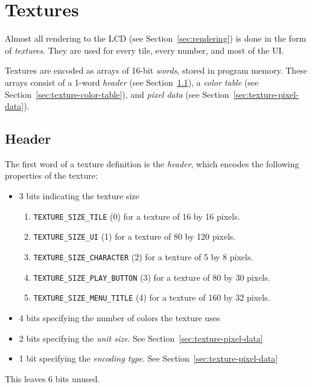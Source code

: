 \section{Textures}
\label{sec:textures}

Almost all rendering to the LCD (see Section~\ref{sec:rendering}) is done in
the form of \emph{textures}. They are used for every tile, every number, and
most of the UI\@.

Textures are encoded as arrays of 16-bit \emph{words}, stored in program
memory. These arrays consist of a 1-word \emph{header} (see
Section~\ref{sec:texture-header}), a \emph{color table} (see
Section~\ref{sec:texture-color-table}), and \emph{pixel data} (see
Section~\ref{sec:texture-pixel-data}).

\subsection{Header}
\label{sec:texture-header}

The first word of a texture definition is the \emph{header}, which encodes the
following properties of the texture:

\begin{itemize}
\item 3 bits indicating the texture size

  \begin{enumerate}
  \item \texttt{TEXTURE\_SIZE\_TILE} (0) for a texture of 16 by 16 pixels.
  \item \texttt{TEXTURE\_SIZE\_UI} (1) for a texture of 80 by 120 pixels.
  \item \texttt{TEXTURE\_SIZE\_CHARACTER} (2) for a texture of 5 by 8 pixels.
  \item \texttt{TEXTURE\_SIZE\_PLAY\_BUTTON} (3) for a texture of 80 by 30
    pixels.
  \item \texttt{TEXTURE\_SIZE\_MENU\_TITLE} (4) for a texture of 160 by 32
    pixels.
  \end{enumerate}

\item 4 bits specifying the number of colors the texture uses
\item 2 bits specifying the \emph{unit size}. See
  Section~\ref{sec:texture-pixel-data}
\item 1 bit specifying the \emph{encoding type}. See
  Section~\ref{sec:texture-pixel-data}
\end{itemize}

This leaves 6 bits unused.

